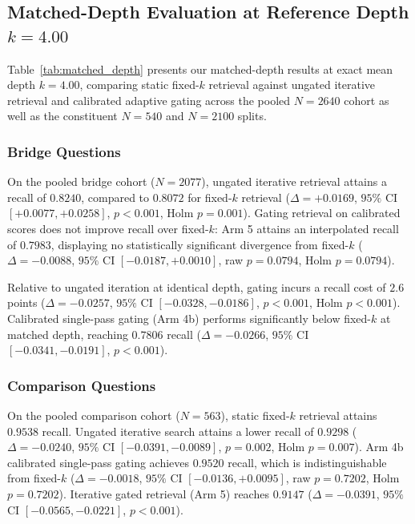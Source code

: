 \documentclass[conference]{IEEEtran}
\begin{document}
\subsection{Matched-Depth Evaluation at Reference Depth $k=4.00$}
Table~\ref{tab:matched_depth} presents our matched-depth results at exact mean depth $k=4.00$, comparing static fixed-$k$ retrieval against ungated iterative retrieval and calibrated adaptive gating across the pooled $N=2640$ cohort as well as the constituent $N=540$ and $N=2100$ splits.

\subsubsection{Bridge Questions}
On the pooled bridge cohort ($N=2077$), ungated iterative retrieval attains a recall of $0.8240$, compared to $0.8072$ for fixed-$k$ retrieval ($\Delta = +0.0169$, $95\%$ CI $[+0.0077, +0.0258]$, $p < 0.001$, Holm $p=0.001$). Gating retrieval on calibrated scores does not improve recall over fixed-$k$: Arm 5 attains an interpolated recall of $0.7983$, displaying no statistically significant divergence from fixed-$k$ ($\Delta = -0.0088$, $95\%$ CI $[-0.0187, +0.0010]$, raw $p = 0.0794$, Holm $p = 0.0794$).

Relative to ungated iteration at identical depth, gating incurs a recall cost of $2.6$ points ($\Delta = -0.0257$, $95\%$ CI $[-0.0328, -0.0186]$, $p < 0.001$, Holm $p < 0.001$). Calibrated single-pass gating (Arm 4b) performs significantly below fixed-$k$ at matched depth, reaching $0.7806$ recall ($\Delta = -0.0266$, $95\%$ CI $[-0.0341, -0.0191]$, $p < 0.001$).

\subsubsection{Comparison Questions}
On the pooled comparison cohort ($N=563$), static fixed-$k$ retrieval attains $0.9538$ recall. Ungated iterative search attains a lower recall of $0.9298$ ($\Delta = -0.0240$, $95\%$ CI $[-0.0391, -0.0089]$, $p = 0.002$, Holm $p=0.007$). Arm 4b calibrated single-pass gating achieves $0.9520$ recall, which is indistinguishable from fixed-$k$ ($\Delta = -0.0018$, $95\%$ CI $[-0.0136, +0.0095]$, raw $p = 0.7202$, Holm $p = 0.7202$). Iterative gated retrieval (Arm 5) reaches $0.9147$ ($\Delta = -0.0391$, $95\%$ CI $[-0.0565, -0.0221]$, $p < 0.001$).
\end{document}
